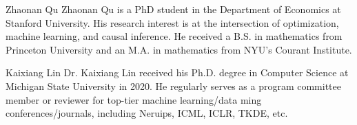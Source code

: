 \documentclass[journal]{IEEEtran}
\begin{document}

%









% 
\newpage

%




  
\newpage
\begin{IEEEbiography}{Zhaonan Qu}
Zhaonan Qu is a PhD student in the Department of Economics at Stanford University. His research interest is at the intersection of optimization, machine learning, and causal inference. He received a B.S. in mathematics from Princeton University and an M.A. in mathematics from NYU's Courant Institute.
\end{IEEEbiography}

\begin{IEEEbiography}{Kaixiang Lin}
Dr. Kaixiang Lin received his Ph.D. degree in Computer Science at Michigan State University in 2020. He regularly serves as a program committee member or reviewer for top-tier machine learning/data ming conferences/journals, including Neruips, ICML, ICLR, TKDE, etc.
\end{IEEEbiography}
\end{document}
